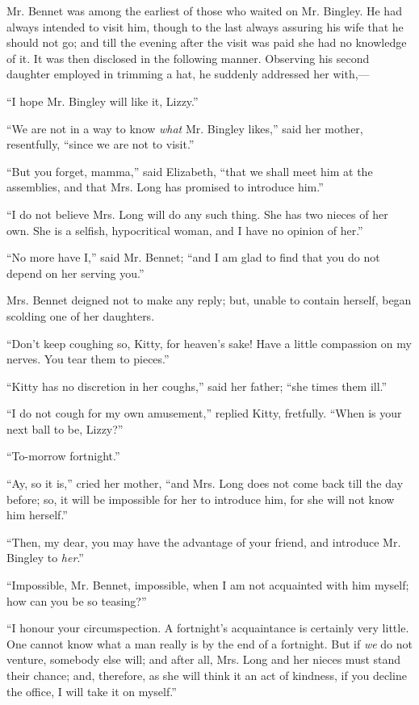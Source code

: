 Mr. Bennet was among the earliest of those who waited on Mr. Bingley. He had always intended to visit him, though to the last always assuring his wife that he should not go; and till the evening after the visit was paid she had no knowledge of it. It was then disclosed in the following manner. Observing his second daughter employed in trimming a hat, he suddenly addressed her with,---

``I hope Mr. Bingley will like it, Lizzy.''

``We are not in a way to know \textit{what} Mr. Bingley likes,'' said her mother, resentfully, ``since we are not to visit.''

``But you forget, mamma,'' said Elizabeth, ``that we shall meet him at the assemblies, and that Mrs. Long has promised to introduce him.''

``I do not believe Mrs. Long will do any such thing. She has two nieces of her own. She is a selfish, hypocritical woman, and I have no opinion of her.''

``No more have I,'' said Mr. Bennet; ``and I am glad to find that you do not depend on her serving you.''

Mrs. Bennet deigned not to make any reply; but, unable to contain herself, began scolding one of her daughters.

``Don't keep coughing so, Kitty, for heaven's sake! Have a little compassion on my nerves. You tear them to pieces.''

``Kitty has no discretion in her coughs,'' said her father; ``she times them ill.''

``I do not cough for my own amusement,'' replied Kitty, fretfully. ``When is your next ball to be, Lizzy?''

``To-morrow fortnight.''

``Ay, so it is,'' cried her mother, ``and Mrs. Long does not come back till the day before; so, it will be impossible for her to introduce him, for she will not know him herself.''

``Then, my dear, you may have the advantage of your friend, and introduce Mr. Bingley to \textit{her}.''

``Impossible, Mr. Bennet, impossible, when I am not acquainted with him myself; how can you be so teasing?''

``I honour your circumspection. A fortnight's acquaintance is certainly very little. One cannot know what a man really is by the end of a fortnight. But if \textit{we} do not venture, somebody else will; and after all, Mrs. Long and her nieces must stand their chance; and, therefore, as she will think it an act of kindness, if you decline the office, I will take it on myself.''

